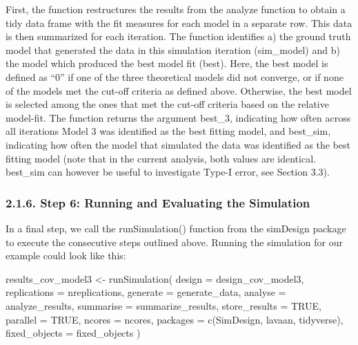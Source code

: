 \documentclass[
  man,floatsintext]{apa6}
\newenvironment{Shaded}{\begin{snugshade}}{\end{snugshade}}
\newcommand{\AttributeTok}[1]{\textcolor[rgb]{0.77,0.63,0.00}{#1}}
\newcommand{\ConstantTok}[1]{\textcolor[rgb]{0.00,0.00,0.00}{#1}}
\newcommand{\FunctionTok}[1]{\textcolor[rgb]{0.00,0.00,0.00}{#1}}
\newcommand{\NormalTok}[1]{#1}
\newcommand{\OtherTok}[1]{\textcolor[rgb]{0.56,0.35,0.01}{#1}}
\newcommand{\StringTok}[1]{\textcolor[rgb]{0.31,0.60,0.02}{#1}}
\begin{document}
First, the function restructures the results from the analyze function to obtain a tidy data frame with the fit measures for each model in a separate row. This data is then summarized for each iteration. The function identifies a) the ground truth model that generated the data in this simulation iteration (sim\_model) and b) the model which produced the best model fit (best). Here, the best model is defined as ``0'' if one of the three theoretical models did not converge, or if none of the models met the cut-off criteria as defined above. Otherwise, the best model is selected among the ones that met the cut-off criteria based on the relative model-fit. The function returns the argument best\_3, indicating how often across all iterations Model 3 was identified as the best fitting model, and best\_sim, indicating how often the model that simulated the data was identified as the best fitting model (note that in the current analysis, both values are identical. best\_sim can however be useful to investigate Type-I error, see Section 3.3).

\hypertarget{step-6-running-and-evaluating-the-simulation}{%
\subsubsection{2.1.6. Step 6: Running and Evaluating the Simulation}\label{step-6-running-and-evaluating-the-simulation}}

In a final step, we call the runSimulation() function from the simDesign package to execute the consecutive steps outlined above. Running the simulation for our example could look like this:

\begin{Shaded}
\begin{Highlighting}[]
\NormalTok{results\_cov\_model3 }\OtherTok{\textless{}{-}}
  \FunctionTok{runSimulation}\NormalTok{(}
    \AttributeTok{design =}\NormalTok{ design\_cov\_model3,}
    \AttributeTok{replications =}\NormalTok{ nreplications,}
    \AttributeTok{generate =}\NormalTok{ generate\_data,}
    \AttributeTok{analyse =}\NormalTok{ analyze\_results,}
    \AttributeTok{summarise =}\NormalTok{ summarize\_results,}
    \AttributeTok{store\_results =} \ConstantTok{TRUE}\NormalTok{,}
    \AttributeTok{parallel =} \ConstantTok{TRUE}\NormalTok{,}
    \AttributeTok{ncores =}\NormalTok{ ncores,}
    \AttributeTok{packages =} \FunctionTok{c}\NormalTok{(}\StringTok{\textquotesingle{}SimDesign\textquotesingle{}}\NormalTok{, }\StringTok{\textquotesingle{}lavaan\textquotesingle{}}\NormalTok{, }\StringTok{\textquotesingle{}tidyverse\textquotesingle{}}\NormalTok{),}
    \AttributeTok{fixed\_objects =}\NormalTok{ fixed\_objects}
\NormalTok{  )}
\end{Highlighting}
\end{Shaded}
\end{document}
